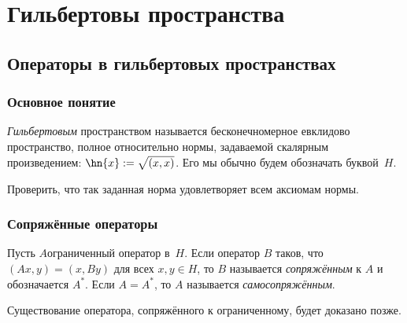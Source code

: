 \documentclass[a4paper]{article}
\begin{document}
\dmvntrail


\pagebreak
\pagestyle{headings}

\makeatletter
  \renewcommand{\headheight}{11mm}
  \renewcommand{\headsep}{2mm}
  \renewcommand{\sectionmark}[1]{}
  \renewcommand{\subsectionmark}[1]{}
  \renewcommand{\subsubsectionmark}[1]{\markright{\thesubsubsection. #1}}
  \renewcommand{\@oddhead}{\vbox{\hbox to \textwidth{\scriptsize\thepage\hfil\rightmark\strut}\hrule}}
  \renewcommand{\@oddfoot}{\hfil\thepage\hfil}
\makeatother




\section{Гильбертовы пространства}

\subsection{Операторы в гильбертовых пространствах}

\subsubsection{Основное понятие}

\begin{df}
\emph{Гильбертовым} пространством называется бесконечномерное евклидово пространство, полное относительно нормы,
задаваемой скалярным произведением: $\hn{x} := \sqrt{(x,x)}$. Его мы обычно будем обозначать
буквой~$H$.
\end{df}

\begin{problem}
Проверить, что так заданная норма удовлетворяет всем аксиомам нормы.
\end{problem}

\subsubsection{Сопряжённые операторы}

\begin{df}
Пусть $A$\т ограниченный оператор в~$H$.
Если оператор $B$ таков, что $(Ax,y) = (x,By)$ для всех $x,y\in H$, то $B$ называется \emph{сопряжённым} к $A$
и обозначается $A^*$. Если $A = A^*$, то $A$ называется \emph{самосопряжённым}.
\end{df}

\begin{note}
Существование оператора, сопряжённого к ограниченному, будет доказано позже.
\end{note}
\end{document}
